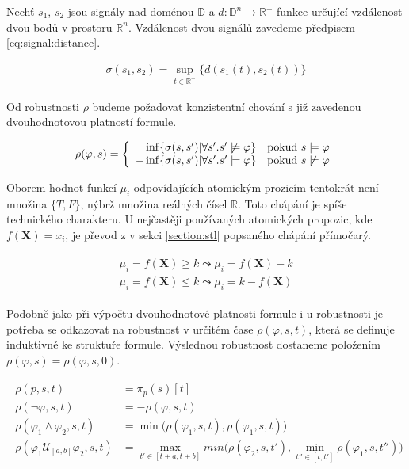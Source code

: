 Nechť $s_1$, $s_2$ jsou signály nad doménou $\mathbb{D}$ a $d: \mathbb{D}^n \rightarrow \mathbb{R}^{+}$
funkce určující vzdálenost dvou bodů v prostoru $\mathbb{R}^n$. 
Vzdálenost dvou signálů zavedeme předpisem \ref{eq:signal:distance}.

\begin{align}\label{eq:signal:distance}
\sigma(s_1, s_2) = {\displaystyle \sup_{t \in \mathbb{R}^{+}}} \{d(s_1(t), s_2(t))\}
\end{align}

Od robustnosti $\rho$ budeme požadovat konzistentní chování s již zavedenou dvouhodnotovou platností
formule. 

\begin{align}
\rho(\varphi, s) = \left\{\begin{array}{r@{\quad}c}
\inf\{\sigma(s, s') | \forall s'. s' \not\models \varphi \}	& \textrm{pokud } s \models \varphi	\\
- \inf\{\sigma(s, s') | \forall s'. s' \models \varphi \}	& \textrm{pokud } s \not\models \varphi
\end{array} \right.
\end{align}

Oborem hodnot funkcí $\mu_i$ odpovídajících atomickým prozicím tentokrát není množina $\{T, F\}$,
nýbrž množina reálných čísel $\mathbb{R}$. Toto chápání je spíše technického charakteru. U nejčastěji používaných
atomických propozic, kde $f(\mathbf{X}) = x_i$, je převod z v sekci \ref{section:stl} popsaného chápání přímočarý.

\begin{align}\label{eq:stl:semantics}
\begin{array}{ll}
\mu_i = f(\mathbf{X}) \geq k		\leadsto \mu_i = f(\mathbf{X}) - k							\\
\mu_i = f(\mathbf{X}) \leq k		\leadsto \mu_i = k - f(\mathbf{X})
\end{array}
\end{align}

Podobně jako při výpočtu dvouhodnotové platnosti formule i u robustnosti je potřeba se odkazovat
na robustnost v určitém čase $\rho(\varphi, s, t)$, která se definuje induktivně ke struktuře
formule. Výslednou robustnost dostaneme položením $\rho(\varphi, s) = \rho(\varphi, s, 0)$.

\begin{align}\label{eq:stl:semantics}
\begin{array}{ll}
\rho(p, s, t)											&= \pi_p(s)[t]											\\
\rho(\neg\varphi, s, t)									&= - \rho(\varphi, s, t)								\\
\rho(\varphi_1 \wedge \varphi_2, s, t)					&= \min\Big(\rho(\varphi_1, s, t), \rho(\varphi_1, s, t)\Big)	\\
\rho(\varphi_1 \mathcal{U}_{[a, b]} \varphi_2, s, t)	&= {\displaystyle \max_{t' \in [t + a, t + b]}} min\Big(\rho(\varphi_2, s, t'), {\displaystyle\min_{t'' \in [t, t']}}\rho(\varphi_1, s, t'')\Big)
\end{array}
\end{align}

